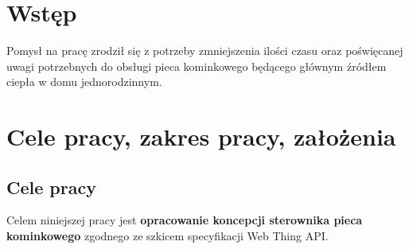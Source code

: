 \documentclass[11pt,a4paper]{report}
\begin{document}
 \begin{titlepage}
 \vspace{0.1\textheight}
 \bigskip
 \vspace{0.3\textheight}
 \par

 \vspace{0.1\textheight}
 \end{titlepage}


 \tableofcontents


 \chapter*{Wstęp}

Pomysł na pracę zrodził się z potrzeby zmniejszenia ilości czasu oraz poświęcanej uwagi potrzebnych do obsługi pieca kominkowego będącego głównym źródłem ciepła w domu jednorodzinnym.

 \chapter{Cele pracy, zakres pracy, założenia}

 \section{Cele pracy}
 Celem niniejszej pracy jest \textbf{opracowanie koncepcji sterownika pieca kominkowego} zgodnego ze szkicem specyfikacji Web Thing API.
 
\end{document}
